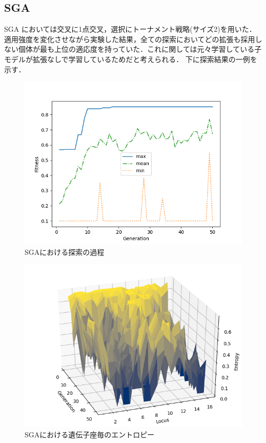 \documentclass[onecolumn]{ujarticle}   %
\begin{document}
  \subsection{SGA}
  SGA においては交叉に1点交叉，選択にトーナメント戦略(サイズ2)を用いた．適用強度を変化させながら実験した結果，全ての探索においてどの拡張も採用しない個体が最も上位の適応度を持っていた．これに関しては元々学習している子モデルが拡張なしで学習しているためだと考えられる．
  下に探索結果の一例を示す．

  \begin{figure}[h]
		\begin{center}
			\includegraphics[width=0.7\columnwidth]{stats_SGA.png}
			\caption{SGAにおける探索の過程}
			\label{fig:SGA_stats}
		\end{center}
	\end{figure}

  \begin{figure}[h]
		\begin{center}
			\includegraphics[width=0.7\columnwidth]{entropy_SGA.png}
			\caption{SGAにおける遺伝子座毎のエントロピー}
			\label{fig:SGA_entropy}
		\end{center}
	\end{figure}
\end{document}
